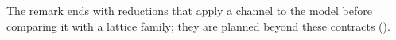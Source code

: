 
The remark ends with reductions that apply a channel to the model before
comparing it with a lattice family; they are planned beyond these contracts
().

